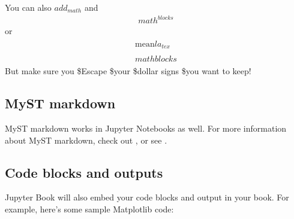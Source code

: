 \documentclass[letterpaper,10pt,english]{jupyterBook}
\begin{document}
\sphinxAtStartPar
You can also \(add_{math}\) and
\begin{equation*}
\begin{split}
math^{blocks}
\end{split}
\end{equation*}
\sphinxAtStartPar
or
\begin{equation*}
\begin{split}
\begin{aligned}
\mbox{mean} la_{tex} \\ \\
math blocks
\end{aligned}
\end{split}
\end{equation*}
\sphinxAtStartPar
But make sure you \$Escape \$your \$dollar signs \$you want to keep!


\subsection{MyST markdown}
\label{\detokenize{src/test/notebooks:myst-markdown}}
\sphinxAtStartPar
MyST markdown works in Jupyter Notebooks as well. For more information about MyST markdown, check
out ,
or see .


\subsection{Code blocks and outputs}
\label{\detokenize{src/test/notebooks:code-blocks-and-outputs}}
\sphinxAtStartPar
Jupyter Book will also embed your code blocks and output in your book.
For example, here’s some sample Matplotlib code:
\end{document}
